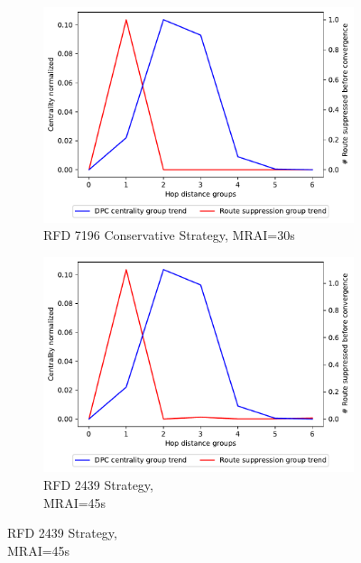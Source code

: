 \begin{figure}[H]
\begin{subfigure}[b]{0.325\textwidth}
     \end{subfigure}
     \hfill
     \begin{subfigure}[b]{0.325\textwidth}
         \centering
         \includegraphics[width=\textwidth]{images/RFD/miceVSelephants/MultiMRAI/30/elephants/cisco_1000_RFD_7196_conservative_nodeConvergence_centVSsup_trend.pdf}
         \caption{RFD 7196 Conservative Strategy, MRAI=30s}
         \label{fig:1000_7196RFDC_centVSsup_elephants}
     \end{subfigure}
     \vfill
     \begin{subfigure}[b]{0.325\textwidth}
         \centering
         \includegraphics[width=\textwidth]{images/RFD/miceVSelephants/MultiMRAI/45/elephants/cisco_1000_RFD_nodeConvergence_centVSsup_trend.pdf}
         \caption{RFD 2439 Strategy, \\MRAI=45s}

\end{subfigure}
\end{figure}
